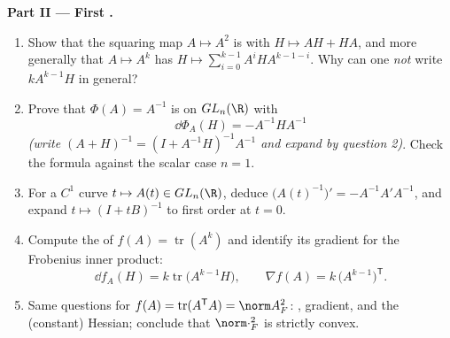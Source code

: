 \begin{problem}
\medskip
\noindent\textbf{Part II --- First .}
\begin{enumerate}[resume]
  \item Show that the squaring map $A \mapsto A^2$ is
         with  $H \mapsto AH + HA$,
        and more generally that $A \mapsto A^k$ has
         $H \mapsto \sum_{i=0}^{k-1}
        A^iHA^{k-1-i}$. Why can one \emph{not} write $kA^{k-1}H$
        in general?
  \item Prove that $\Phi(A) = A^{-1}$ is  on
        $GL_n(\R)$ with
        \[
        \dd\Phi_A(H) = -A^{-1}HA^{-1}
        \]
        \emph{(write $(A + H)^{-1} = (I + A^{-1}H)^{-1}A^{-1}$
        and expand by question 2)}. Check the formula against
        the scalar case $n = 1$.
  \item For a $C^1$ curve $t \mapsto A(t) \in GL_n(\R)$, deduce
        $\bigl(A(t)^{-1}\bigr)' = -A^{-1}A'A^{-1}$, and expand
        $t \mapsto (I + tB)^{-1}$ to first order at $t = 0$.
  \item Compute the  of $f(A) =
        \operatorname{tr}(A^k)$ and identify its gradient for
        the Frobenius inner product:
        \[
        \dd f_A(H) = k\operatorname{tr}\bigl(A^{k-1}H\bigr),
        \qquad
        \nabla f(A) = k\,\bigl(A^{k-1}\bigr)^{\mathsf T} .
        \]
  \item Same questions for $f(A) = \operatorname{tr}
        (A^{\mathsf T}A) = \norm A_F^2$: ,
        gradient, and the (constant) Hessian; conclude that
        $\norm\cdot_F^2$ is strictly convex.
\end{enumerate}


\end{problem}
